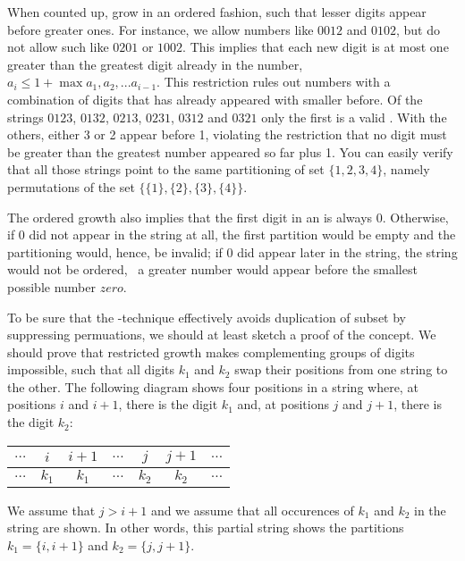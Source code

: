 \documentclass{scrreprt}
\newcommand{\Varid}[1]{\mathit{#1}}
\begin{document}
When counted up,  grow in an ordered fashion,
such that lesser digits appear before greater ones.
For instance, we allow numbers like $0012$ and $0102$,
but do not allow such like $0201$ or $1002$.
This implies that each new digit is at most one greater
than the greatest digit already in the number, \ie\
$a_i \le 1 + \max{a_1,a_2,...a_{i-1}}$.
This restriction rules out numbers with a combination of digits
that has already appeared with smaller  before.
Of the strings
$0123$, $0132$, $0213$, $0231$, $0312$ and $0321$
only the first is a valid .
With the others, either 3 or 2 appear
before 1, violating the restriction that no digit
must be greater than the greatest number appeared so far
plus 1. You can easily verify that
all those strings point to the same partitioning
of set $\lbrace 1,2,3,4\rbrace$, namely permutations
of the set
$\lbrace\lbrace 1\rbrace,
        \lbrace 2\rbrace,
        \lbrace 3\rbrace,
        \lbrace 4\rbrace\rbrace$.

The ordered growth also implies 
that the first digit in an  is always 0.
Otherwise, if 0 did not appear in the string at all,
the first partition would be empty and
the partitioning would, hence, be invalid;
if 0 did appear later in the string,
the string would not be ordered, \ie\
a greater number would appear 
before the smallest possible number \ensuremath{\Varid{zero}}.

To be sure that the -technique effectively
avoids duplication of subset by suppressing permuations,
we should at least sketch a proof of the concept.
We should prove that restricted growth makes 
complementing groups of digits impossible, such
that all digits $k_1$ and $k_2$ swap their positions
from one string to the other.
The following diagram shows four positions
in a string where, at positions $i$ and $i+1$,
there is the digit $k_1$ and, at positions $j$ and $j+1$,
there is the digit $k_2$:

\begin{tabular}{c|c|c|c|c|c|c}
$\dots$ & $i$   & $i+1$ & $\dots$ & $j$   & $j+1$ & $\dots$\\\hline
$\dots$ & $k_1$ & $k_1$ & $\dots$ & $k_2$ & $k_2$ & $\dots$
\end{tabular}

We assume that $j > i+1$ and we assume that all occurences of $k_1$ and $k_2$
in the string are shown.
In other words, this partial string shows the partitions
$k_1 = \lbrace i,i+1\rbrace$ and
$k_2 = \lbrace j,j+1\rbrace$.
\end{document}

